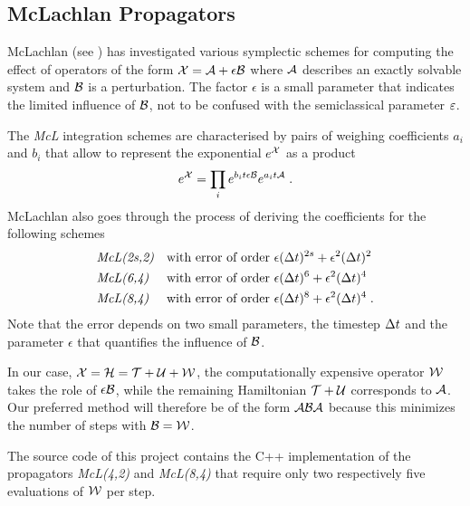 \subsection{McLachlan Propagators}
\label{sub:mcl_propagator}
%
McLachlan (see \cite{McLachlan1995}) has investigated various symplectic schemes for computing the effect of operators of the form $\mathcal{X} = \mathcal{A} + \epsilon \mathcal{B}$ where $\mathcal{A}$ describes an exactly solvable system and $\mathcal{B}$ is a perturbation.
The factor $\epsilon$ is a small parameter that indicates the limited influence of $\mathcal{B}$, not to be confused with the semiclassical parameter $\varepsilon$.
\par\medskip
The \emph{McL} integration schemes are characterised by pairs of weighing coefficients $a_i$ and $b_i$ that allow to represent the exponential $e^{\mathcal{X}}$ as a product
%
\begin{align}
	e^{\mathcal{X}} = \prod_i e^{b_i t \epsilon \mathcal{B}} e^{a_i t \mathcal{A}} \; .
\end{align}
%
McLachlan also goes through the process of deriving the coefficients for the following schemes
\begin{align*}
	&\text{\emph{McL(2s,2)}} &&\text{with error of order } \epsilon (\Delta t)^{2s} + \epsilon^2 (\Delta t)^2 \\
	&\text{\emph{McL(6,4)}} &&\text{with error of order } \epsilon (\Delta t)^{6} + \epsilon^2 (\Delta t)^4 \\
	&\text{\emph{McL(8,4)}} &&\text{with error of order } \epsilon (\Delta t)^{8} + \epsilon^2 (\Delta t)^4 \; .
\end{align*}
%
Note that the error depends on two small parameters, the timestep $\Delta t$ and the parameter $\epsilon$ that quantifies the influence of $\mathcal{B}$.
\par\medskip
%
In our case, $\mathcal{X} = \mathcal{H} = \mathcal{T} + \mathcal{U} + \mathcal{W}$, the computationally expensive operator $\mathcal{W}$ takes the role of $\epsilon \mathcal{B}$, while the remaining Hamiltonian $\mathcal{T} + \mathcal{U}$ corresponds to $\mathcal{A}$. 
Our preferred method will therefore be of the form $\mathcal{A} \mathcal{B} \mathcal{A}$ because this minimizes the number of steps with $\mathcal{B} = \mathcal{W}$.
\par\medskip
%
The source code of this project contains the C++ implementation of the propagators \emph{McL(4,2)} and \emph{McL(8,4)} that require only two respectively five evaluations of $\mathcal{W}$ per step.

